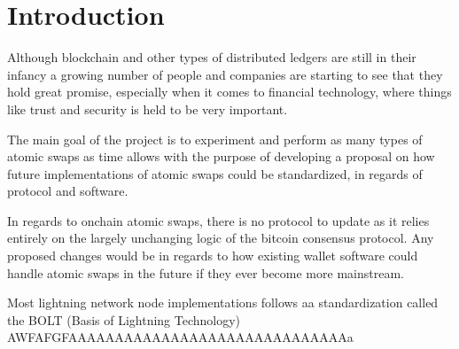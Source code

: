 
\chapter{Introduction}
Although blockchain and other types of distributed ledgers are still in their
infancy a growing number of people and companies are starting to see that they
hold great promise, especially when it comes to financial technology, where
things like trust and security is held to be very important.







The main goal of the project is to experiment and perform as many types of atomic swaps as time allows with the purpose of developing a proposal on how future implementations of atomic swaps could be standardized, in regards of protocol and software.

In regards to onchain atomic swaps, there is no protocol to update as it relies entirely on the largely unchanging logic of the bitcoin consensus protocol. Any proposed changes would be in regards to how existing wallet software could handle atomic swaps in the future if they ever become more mainstream.

Most lightning network node implementations follows aa standardization called the BOLT (Basis of Lightning Technology) AWFAFGFAAAAAAAAAAAAAAAAAAAAAAAAAAAAAAa